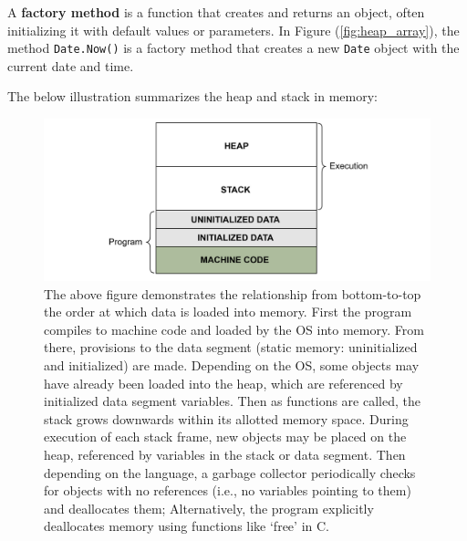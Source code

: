 \begin{Def}

    A \textbf{factory method} is a function that creates and returns an object, often initializing it with default values or parameters.
    In Figure (\ref{fig:heap_array}), the method \texttt{Date.Now()} is a factory method that creates a new \texttt{Date} object with the current date and time.
\end{Def}

\noindent
The below illustration summarizes the heap and stack in memory:
\begin{figure}[!ht]

    \hspace{-6em} \includegraphics[width=1.3\textwidth]{./Sections/stacks_heaps/stack_heap_memory.png}
    \caption{The above figure demonstrates the relationship from bottom-to-top the order at which data is 
    loaded into memory. First the program compiles to machine code and loaded by the OS into memory.
    From there, provisions to the data segment (static memory: uninitialized and initialized) are made. Depending 
    on the OS, some objects may have already been loaded into the heap, which are referenced by initialized data segment variables.
    Then as functions are called, the stack grows downwards within its allotted memory space. During execution of each stack frame,
    new objects may be placed on the heap, referenced by variables in the stack or data segment. Then depending on the language,
    a garbage collector periodically checks for objects with no references (i.e., no variables pointing to them) and deallocates them;
    Alternatively, the program explicitly deallocates memory using functions like `free' in C.}
    \label{fig:stack_heap_memory}
\end{figure}